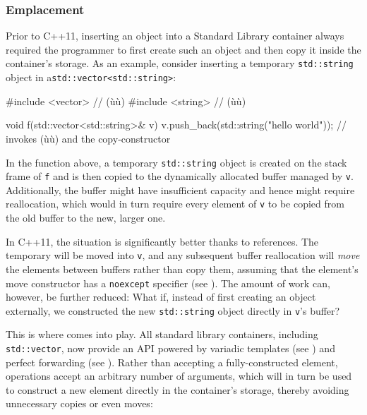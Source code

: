 \subsubsection[Emplacement]{Emplacement}\label{emplacement}

Prior to C++11, inserting an object into a Standard Library container
always required the programmer to first create such an object and then
copy it inside the container's storage. As an example, consider
inserting a temporary \lstinline!std::string! object in a\linebreak[4]
\mbox{\lstinline!std::vector<std::string>!}:

\begin{emcppshiddenlisting}[emcppsbatch=e11]
#include <vector>  // (ù{}ù)
#include <string>  // (ù{}ù)
\end{emcppshiddenlisting}
\begin{emcppslisting}[emcppsbatch=e11]
void f(std::vector<std::string>& v)
{
    v.push_back(std::string("hello world"));
        // invokes (ù{}ù) and the copy-constructor
}
\end{emcppslisting}

\noindent In the function above, a temporary \lstinline!std::string! object is
created on the stack frame of \lstinline!f! and is then copied to the
dynamically allocated buffer managed by \lstinline!v!. Additionally, the
buffer might have insufficient capacity and hence might require
reallocation, which would in turn require every element of \lstinline!v! to
be copied from the old buffer to the new, larger one.

In C++11, the situation is significantly better thanks to
 references. The temporary will be moved into
\lstinline!v!, and any subsequent buffer reallocation will \emph{move} the elements
between buffers rather than copy them, assuming that the element's
move constructor has a \lstinline!noexcept! specifier (see ).
The amount of work
can, however, be further reduced: What if, instead of first creating
an object externally, we constructed the new \lstinline!std::string! object
directly in \lstinline!v!'s buffer?

This is where  comes into play. All standard library
containers, including \lstinline!std::vector!, now provide an
 API powered by variadic templates (see )
and perfect forwarding (see ).
Rather than accepting a
fully-constructed element,  operations accept an
arbitrary number of arguments, which will in turn be used to construct a
new element directly in the container's storage, thereby avoiding
unnecessary copies or even moves:

